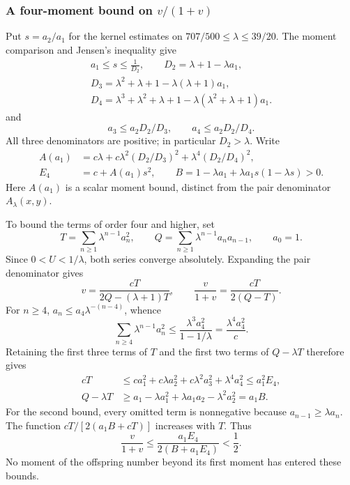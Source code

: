 \subsubsection{A four-moment bound on \texorpdfstring{$v/(1+v)$}{v/(1+v)}}
Put $s=a_2/a_1$ for the kernel estimates on $707/500\le\lambda\le39/20$. The moment comparison and Jensen's inequality give
\begin{equation}\label{eq:mh-moment-domain}
 \begin{gathered}
 a_1\le s\le\frac1{D_2},\qquad D_2=\lambda+1-\lambda a_1,\\
 D_3=\lambda^2+\lambda+1-\lambda(\lambda+1)a_1,\\
 D_4=\lambda^3+\lambda^2+\lambda+1-\lambda(\lambda^2+\lambda+1)a_1.
 \end{gathered}
\end{equation}
and
\[
 a_3\le a_2D_2/D_3,\qquad a_4\le a_2D_2/D_4.
\]
All three denominators are positive; in particular $D_2>\lambda$. Write
\begin{equation}\label{eq:mh-four-envelope}
 \begin{split}
 A(a_1)&=c\lambda+c\lambda^2(D_2/D_3)^2+\lambda^4(D_2/D_4)^2,\\
 E_4&=c+A(a_1)s^2,\qquad
 B=1-\lambda a_1+\lambda a_1s(1-\lambda s)>0.
 \end{split}
\end{equation}
Here $A(a_1)$ is a scalar moment bound, distinct from the pair denominator $A_\lambda(x,y)$.

To bound the terms of order four and higher, set
\[
 T=\sum_{n\ge1}\lambda^{n-1}a_n^2,
 \qquad Q=\sum_{n\ge1}\lambda^{n-1}a_na_{n-1},\qquad a_0=1.
\]
Since $0<U<1/\lambda$, both series converge absolutely. Expanding the pair denominator gives
\begin{equation}\label{eq:mh-moment-speed}
 v=\frac{cT}{2Q-(\lambda+1)T},\qquad
 \frac{v}{1+v}=\frac{cT}{2(Q-T)}.
\end{equation}
For $n\ge4$, $a_n\le a_4\lambda^{-(n-4)}$, whence
\[
 \sum_{n\ge4}\lambda^{n-1}a_n^2
 \le\frac{\lambda^3a_4^2}{1-1/\lambda}
 =\frac{\lambda^4a_4^2}{c}.
\]
Retaining the first three terms of $T$ and the first two terms of $Q-\lambda T$ therefore gives
\begin{align*}
 cT&\le c a_1^2+c\lambda a_2^2+c\lambda^2a_3^2+\lambda^4a_4^2
 \le a_1^2E_4,\\
 Q-\lambda T&\ge a_1-\lambda a_1^2+\lambda a_1a_2-\lambda^2a_2^2=a_1B.
\end{align*}
For the second bound, every omitted term is nonnegative because $a_{n-1}\ge\lambda a_n$. The function $cT/[2(a_1B+cT)]$ increases with $T$. Thus
\begin{equation}\label{eq:mh-speed-upper}
 \frac{v}{1+v}\le\frac{a_1E_4}{2(B+a_1E_4)}<\frac12.
\end{equation}
No moment of the offspring number beyond its first moment has entered these bounds.

